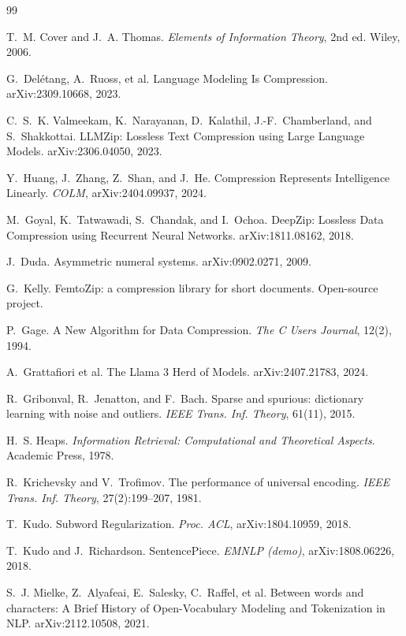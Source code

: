 \documentclass[10pt,twocolumn]{article}
\theoremstyle{plain}
\theoremstyle{definition}
\begin{document}

\begin{thebibliography}{99}\small

 T.~M. Cover and J.~A. Thomas.
\emph{Elements of Information Theory}, 2nd ed. Wiley, 2006.

 G.~Del\'{e}tang, A.~Ruoss, et al.
Language Modeling Is Compression. arXiv:2309.10668, 2023.

 C.~S.~K. Valmeekam, K.~Narayanan, D.~Kalathil,
J.-F.~Chamberland, and S.~Shakkottai.
LLMZip: Lossless Text Compression using Large Language Models. arXiv:2306.04050, 2023.

 Y.~Huang, J.~Zhang, Z.~Shan, and J.~He.
Compression Represents Intelligence Linearly. \emph{COLM}, arXiv:2404.09937, 2024.

 M.~Goyal, K.~Tatwawadi, S.~Chandak, and I.~Ochoa.
DeepZip: Lossless Data Compression using Recurrent Neural Networks.
arXiv:1811.08162, 2018.

 J.~Duda.
Asymmetric numeral systems. arXiv:0902.0271, 2009.

 G.~Kelly. FemtoZip: a compression library for short documents.
Open-source project.

 P.~Gage.
A New Algorithm for Data Compression. \emph{The C Users Journal}, 12(2), 1994.

 A.~Grattafiori et al.
The Llama 3 Herd of Models. arXiv:2407.21783, 2024.

 R.~Gribonval, R.~Jenatton, and F.~Bach.
Sparse and spurious: dictionary learning with noise and outliers.
\emph{IEEE Trans. Inf. Theory}, 61(11), 2015.

 H.~S. Heaps.
\emph{Information Retrieval: Computational and Theoretical Aspects}.
Academic Press, 1978.

 R.~Krichevsky and V.~Trofimov.
The performance of universal encoding.
\emph{IEEE Trans. Inf. Theory}, 27(2):199--207, 1981.

 T.~Kudo.
Subword Regularization. \emph{Proc. ACL}, arXiv:1804.10959, 2018.

 T.~Kudo and J.~Richardson.
SentencePiece. \emph{EMNLP (demo)}, arXiv:1808.06226, 2018.

 S.~J. Mielke, Z.~Alyafeai, E.~Salesky, C.~Raffel, et al.
Between words and characters: A Brief History of Open-Vocabulary Modeling and
Tokenization in NLP. arXiv:2112.10508, 2021.


\end{thebibliography}
\end{document}
